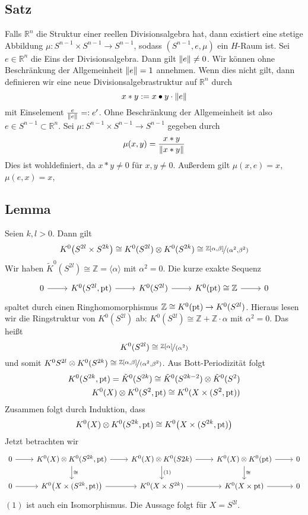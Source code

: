 \subsection{Satz} %
\label{sub:42}
Falls $\mathds{R}^n$ die Struktur einer reellen Divisionsalgebra hat, dann existiert eine stetige Abbildung $\mu \colon S^{n-1} \times S^{n-1} \to S^{n-1}$, sodass 
$(S^{n-1},e,\mu)$ ein $H$-Raum ist.
Sei $e \in \mathds{R}^n$ die Eins der Divisionsalgebra. Dann gilt $\norm{e}\not=0$. Wir können ohne Beschränkung der Allgemeinheit $\norm{e}=1 $ annehmen. Wenn dies nicht 
gilt, dann definieren wir eine neue Divisionsalgebrastruktur auf $\mathds{R}^n$ durch 
\[
	x * y := x \bullet y \cdot \norm{e} 
\]
mit Einselement $\frac{e}{\norm{e}} =: e'$. Ohne Beschränkung der Allgemeinheit ist also $e \in S^{n-1} \subset \mathds{R}^n$. Sei 
$\mu \colon S^{n-1} \times S^{n-1} \to S^{n-1}$ gegeben durch 
\[
	\mu(x,y) = \frac{x * y}{\norm{x * y} } 
\]
Dies ist wohldefiniert, da $x * y\not=0$ für $x,y \not=0$. Außerdem gilt $\mu(x,e)=x$, $\mu(e,x)=x$, \bewende

\subsection{Lemma} %
\label{sub:43}
Seien $k,l >0$. Dann gilt
\[
	K^0 \enbrace*{S^{2l} \times S^{2k}} \cong K^0(S^{2l}) \otimes K^0(S^{2k}) \cong \nicefrac{\mathds{Z}[\alpha,\beta]}{(\alpha^2,\beta^2)}
\]
Wir haben $\tilde{K}^0(S^{2l}) \cong \mathds{Z} = \langle \alpha \rangle$ mit $\alpha^2=0$. Die kurze exakte Sequenz 
\[
	\begin{tikzcd}
		0 \rar & K^0(S^{2l},\pt) \rar & K^0(S^{2l}) \rar & K^0(\pt)\cong \mathds{Z} \rar & 0
	\end{tikzcd}
\]
spaltet durch einen Ringhomomorphismus $\mathds{Z} \cong K^0(\pt) \to K^0(S^{2l})$. Hieraus lesen wir die Ringstruktur von $K^0(S^{2l})$ ab: 
$K^0(S^{2l})\cong \mathds{Z} + \mathds{Z} \cdot \alpha $ mit $\alpha^2=0$. Das heißt 
\[
	K^0(S^{2l}) \cong \nicefrac{\mathds{Z}[\alpha]}{(\alpha^2)}
\]
und somit $K^0{S^{2l}} \otimes K^0(S^{2k}) \cong \nicefrac{\mathds{Z}[\alpha,\beta]}{(\alpha^2,\beta^2)}$. Aus Bott-Periodizität folgt 
\begin{align*}
	K^0(S^{2k},\pt) = \tilde{K}^0(S^{2k}) \cong \tilde{K}^0(S^{2k-2}) \otimes \tilde{K}^0(S^2) \\
	K^0(X) \otimes K^0(S^2,\pt) \cong K^0(X \times (S^2,\pt))
\end{align*}
Zusammen folgt durch Induktion, dass 
\[
	K^0(X) \otimes  K^0(S^{2k},\pt ) \cong K^0 \enbrace*{X \times (S^{2k},\pt)} 
\]
Jetzt betrachten wir
\[
	\begin{tikzcd}
		0 \rar & K^0(X) \otimes  K^0(S^{2k},\pt)\dar["\cong"] \rar & K^0(X) \otimes K^0(S{2k}) \dar["(1)"] \rar & K^0(X) \otimes K^0(\pt) \dar["\cong"] \rar & 0 \\
		0 \rar & K^0 \enbrace*{X \times (S^{2k},\pt)} \rar & K^0(X \times S^{2k}) \rar & K^0(X \times \pt) \rar & 0 
	\end{tikzcd}
\]
$(1)$ ist auch ein Isomorphismus. Die Aussage folgt für $X=S^{2l}$. \bewende

